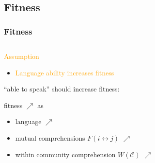 \documentclass{beamer}
\newcommand{\hbEmph}[1]{\textcolor{orange}{#1}}
\newcommand{\hbSet}[1]{\mathcal{#1}}
\theoremstyle{plain}
\theoremstyle{definition}
\theoremstyle{remark}
\begin{document}
\subsection{Fitness}




\begin{frame}\frametitle{Fitness}
	
	\begin{columns}[T]
	\begin{column}{.8\linewidth}   

		\hbEmph{Assumption}
		\begin{itemize}
			\item 
			\hbEmph{Language ability increases fitness}
		\end{itemize}
		
		\vspace{1 cm}
		``able to speak'' should increase fitness:
		\vspace{0.5 cm}
		
		fitness $\nearrow$ as 
		\begin{itemize}
		
			\item
			language $\nearrow$
		
			\item
			mutual comprehensions 
				$F(i \leftrightarrow j)$
				$\nearrow$
		
			\item
			within community comprehension 
				$W(\hbSet{C})$
				$\nearrow$
		\end{itemize}

	\end{column}
	\begin{column}{.2\linewidth}


\end{column}
\end{columns}
\end{frame}
\end{document}
